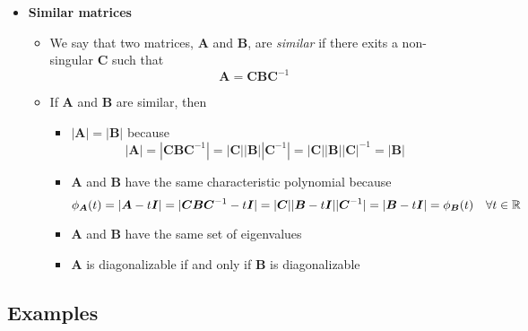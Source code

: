 \documentclass[12pt,a4paper]{article}
\begin{document}
\begin{itemize}
\item \textbf{Similar matrices}
  \begin{itemize}
  \item We say that two matrices, $\bm{A}$ and $\bm{B}$, are \emph{similar}
    if there exits a non-singular $\bm{C}$ such that
    \begin{equation}\nonumber%
      \bm{A} = \bm{C}\bm{B}\bm{C}^{-1}
    \end{equation}
  \item If $\bm{A}$ and $\bm{B}$ are similar, then
    \begin{itemize}
    \item $|\bm{A}| = |\bm{B}|$ because
      \begin{equation}\nonumber%
        |\bm{A}|
        =
        |\bm{C}\bm{B}\bm{C}^{-1}|
        =
        |\bm{C}||\bm{B}||\bm{C}^{-1}|
        =
        |\bm{C}||\bm{B}||\bm{C}|^{-1}
        = |\bm{B}|
      \end{equation}
    \item $\bm{A}$ and $\bm{B}$ have the same characteristic polynomial because
      \begin{equation}\nonumber%
        \phi_{\bm{A}}(t)
        = |\bm{A}-t\bm{I}|
        = |\bm{C}\bm{B}\bm{C}^{-1}-t\bm{I}|
        = |\bm{C}||\bm{B}-t\bm{I}||\bm{C}^{-1}|
        = |\bm{B}-t\bm{I}|
        =
        \phi_{\bm{B}}(t)
        \quad \forall t \in \R
      \end{equation}
    \item $\bm{A}$ and $\bm{B}$ have the same set of eigenvalues
    \item $\bm{A}$ is diagonalizable if and only if $\bm{B}$ is diagonalizable

    \end{itemize}
  \end{itemize}

\end{itemize}

\subsection{Examples}
\end{document}
